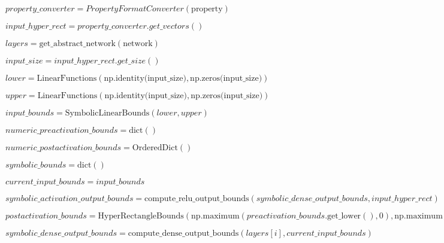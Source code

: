 \begin{algorithm}[t!]
  \caption{Bound Propagation Algorithm}
  \label{alg:bp-pseudocode}
  \small
\begin{algorithmic}[1]
    		\State {}
   		 \State $property\_converter = {PropertyFormatConverter}(\text{property})$
    
    		\State $input\_hyper\_rect = property\_converter.get\_vectors()$
    
    		\State $layers = \text{get\_abstract\_network}(\text{network})$
    
   		\State $input\_size = input\_hyper\_rect.get\_size()$
    
    		\State $lower = \text{LinearFunctions}(\text{np.identity(input\_size)}, \text{np.zeros(input\_size)})$
    
    		\State $upper = \text{LinearFunctions}(\text{np.identity(input\_size)}, \text{np.zeros(input\_size)})$
    
    		\State $input\_bounds = \text{SymbolicLinearBounds}(lower, upper)$
    
    		\State $numeric\_preactivation\_bounds = \text{dict}()$
    
   		\State $numeric\_postactivation\_bounds = \text{OrderedDict}()$
    
    		\State $symbolic\_bounds = \text{dict}()$
    
    		\State $current\_input\_bounds = input\_bounds$
    
    
            			\State $symbolic\_activation\_output\_bounds = \text{compute\_relu\_output\_bounds}(symbolic\_dense\_output\_bounds, input\_hyper\_rect)$
            
            			\State $postactivation\_bounds = \text{HyperRectangleBounds}(\text{np.maximum}(preactivation\_bounds.\text{get\_lower}(), 0), 							\text{np.maximum}(preactivation\_bounds.\text{get\_upper}(), 0))$
            
            			\State $symbolic\_dense\_output\_bounds = \text{compute\_dense\_output\_bounds}(layers[i], current\_input\_bounds)$
            

\end{algorithmic}
\end{algorithm}
